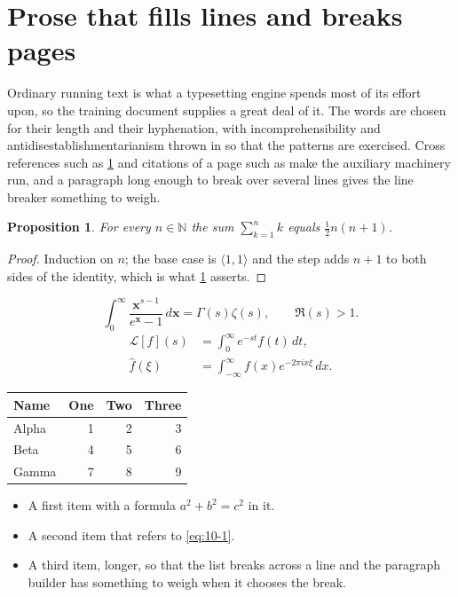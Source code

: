 \documentclass[11pt,a4paper]{report}
\theoremstyle{plain}
\newtheorem{proposition}{Proposition}[chapter]
\newcommand{\vecn}[1]{\mathbf{#1}}
\newcommand{\pairs}[2]{\langle #1,#2\rangle}
\begin{document}
\section{Prose that fills lines and breaks pages}
\label{sec:prose10-1}
Ordinary running text is what a typesetting engine spends most of its effort
upon, so the training document supplies a great deal of it. The words are
chosen for their length and their hyphenation, with incomprehensibility and
antidisestablishmentarianism thrown in so that the patterns are exercised.
Cross references such as \cref{sec:prose10-1} and citations of a page such
as \pageref{sec:prose10-1} make the auxiliary machinery run, and a
paragraph long enough to break over several lines gives the line breaker
something to weigh.
\begin{proposition}\label{prop:10-1}
For every $n\in\mathbb{N}$ the sum $\sum_{k=1}^{n}k$ equals
$\tfrac{1}{2}n(n+1)$.
\end{proposition}
\begin{proof}
Induction on $n$; the base case is $\pairs{1}{1}$ and the step adds $n+1$ to
both sides of the identity, which is what \cref{prop:10-1} asserts.
\end{proof}
\begin{equation}\label{eq:10-1}
  \int_{0}^{\infty}\frac{\vecn{x}^{s-1}}{e^{\vecn{x}}-1}\,d\vecn{x}
    = \Gamma(s)\zeta(s),\qquad \Re(s)>1 .
\end{equation}
\begin{align}
  \mathcal{L}[f](s) &= \int_{0}^{\infty} e^{-st} f(t)\,dt, \\
  \widehat{f}(\xi)  &= \int_{-\infty}^{\infty} f(x) e^{-2\pi i x\xi}\,dx .
\end{align}
\par\noindent\begin{center}
\begin{tabular}{lrrr}
\hline
Name & One & Two & Three \\
\hline
Alpha & 1 & 2 & 3 \\
Beta & 4 & 5 & 6 \\
Gamma & 7 & 8 & 9 \\
\hline
\end{tabular}
\end{center}
\begin{itemize}
  \item A first item with a formula $a^2+b^2=c^2$ in it.
  \item A second item that refers to \eqref{eq:10-1}.
  \item A third item, longer, so that the list breaks across a line and the
    paragraph builder has something to weigh when it chooses the break.
\end{itemize}
\end{document}
